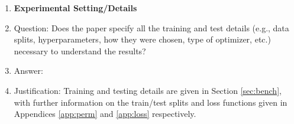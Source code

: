 \documentclass{article}
\begin{document}
\begin{enumerate}
\item {\bf Experimental Setting/Details}
    \item[] Question: Does the paper specify all the training and test details (e.g., data splits, hyperparameters, how they were chosen, type of optimizer, etc.) necessary to understand the results?
    \item[] Answer: \answerYes{} %
    \item[] Justification: Training and testing details are given in Section \ref{sec:bench}, with further information on the train/test splits and loss functions given in Appendices \ref{app:perm} and \ref{app:loss} respectively.


\end{enumerate}
\end{document}
